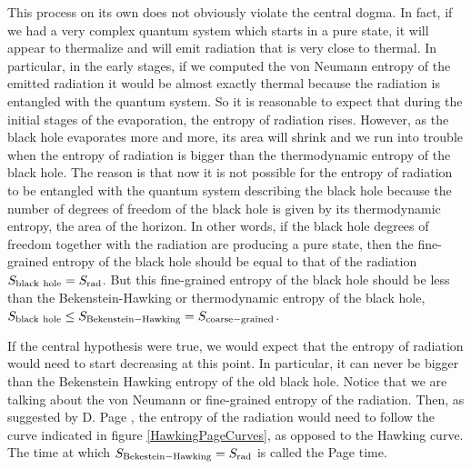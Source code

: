  
 This process on its own does not obviously violate the central dogma. In fact, if we had a very complex quantum system which starts in a pure state, it will appear to thermalize and will emit radiation that is very close to thermal. In particular, in the early stages, if we computed the von Neumann entropy of the emitted radiation it would  be almost exactly thermal because the radiation is entangled with the quantum system. So it is reasonable to expect that during the initial stages of the evaporation, the entropy of radiation rises. However, as the black hole evaporates more and more, its area will shrink and we run into trouble when the entropy of radiation is bigger than the thermodynamic entropy of the black hole. The reason is that now it is not possible for the entropy of radiation to be entangled with the quantum system describing the black hole because the number of degrees of freedom of the black hole is given by its thermodynamic entropy, the area of the horizon.
 In other words, if the black hole degrees of freedom together with the radiation  are producing a pure state, then the fine-grained entropy of the black hole should be equal to that of the radiation $S_{\rm black ~hole} = S_{\rm rad}$. But this fine-grained entropy of the black hole should be less than the Bekenstein-Hawking or thermodynamic entropy of the black hole, 
 $S_{\rm black~hole} \leq S_{\rm Bekenstein-Hawking}=S_{\rm coarse-grained}$. 
 
 If the central hypothesis were true, we would expect that the entropy of radiation would need to start decreasing at this point. In particular, it can never be bigger than the Bekenstein Hawking entropy of the old black hole. Notice that we are talking about the von Neumann or fine-grained entropy of the radiation. 
 Then, 
 as suggested by D. Page \cite{Page:1993wv,Page:2013dx}, the entropy of the radiation would need to follow the curve indicated in figure \ref{HawkingPageCurves}, as opposed to the Hawking curve.
 The time at which $S_{\rm Bekestein-Hawking} = S_{\rm rad}$ is called the Page time.
 
